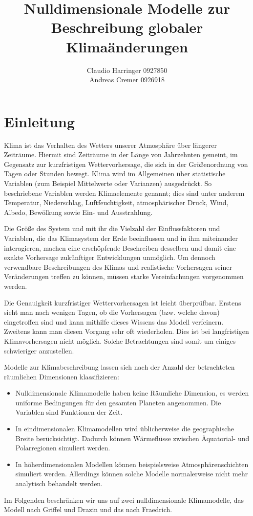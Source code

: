 \documentclass[]{report}
\title{Nulldimensionale Modelle zur Beschreibung globaler Klimaänderungen}
\author{Claudio Harringer 0927850 \\ Andreas Cremer 0926918}
\begin{document}
\maketitle
\tableofcontents
\chapter{Einleitung} 
	Klima ist das Verhalten des Wetters unserer Atmosphäre über längerer Zeiträume. Hiermit sind Zeiträume in der Länge von Jahrzehnten gemeint, im Gegensatz zur kurzfristigen Wettervorhersage, die sich in der Größenordnung von Tagen oder Stunden bewegt. Klima wird im Allgemeinen über statistische Variablen (zum Beispiel Mittelwerte oder Varianzen) ausgedrückt. So beschriebene Variablen werden Klimaelemente genannt; dies sind unter anderem Temperatur, Niederschlag, Luftfeuchtigkeit, atmosphärischer Druck, Wind, Albedo, Bewölkung sowie Ein- und Ausstrahlung.\par\bigskip
	Die Größe des System und mit ihr die Vielzahl der Einflussfaktoren und Variablen, die das Klimasystem der Erde beeinflussen und in ihm miteinander interagieren, machen eine erschöpfende Beschreiben desselben und damit eine exakte Vorhersage zukünftiger Entwicklungen unmöglich. Um dennoch verwendbare Beschreibungen des Klimas und realistische Vorhersagen seiner Veränderungen treffen zu können, müssen starke Vereinfachungen vorgenommen werden.\par\bigskip
	Die Genauigkeit kurzfristiger Wettervorhersagen ist leicht überprüfbar. Erstens sieht man nach wenigen Tagen, ob die Vorhersagen (bzw. welche davon) eingetroffen sind und kann mithilfe dieses Wissens das Modell verfeinern. Zweitens kann man diesen Vorgang sehr oft wiederholen. Dies ist bei langfristigen Klimavorhersagen nicht möglich. Solche Betrachtungen sind somit um einiges schwieriger anzustellen. \par\bigskip
	Modelle zur Klimabeschreibung lassen sich nach der Anzahl der betrachteten räumlichen Dimensionen klassifizieren:
	\begin{itemize}
		\item Nulldimensionale Klimamodelle haben keine Räumliche Dimension, es werden uniforme Bedingungen für den gesamten Planeten angenommen. Die Variablen sind Funktionen der Zeit.
		\item In eindimensionalen Klimamodellen wird üblicherweise die geographische Breite berücksichtigt. Dadurch können Wärmeflüsse zwischen Äquatorial- und Polarregionen simuliert werden.
		\item In höherdimensionalen Modellen können beispielsweise Atmosphärenschichten simuliert werden. Allerdings können solche Modelle normalerweise nicht mehr analytisch behandelt werden.
	\end{itemize}
	Im Folgenden beschränken wir uns auf zwei nulldimensionale Klimamodelle, das Modell nach Griffel und Drazin und das nach Fraedrich.
	
\end{document}
